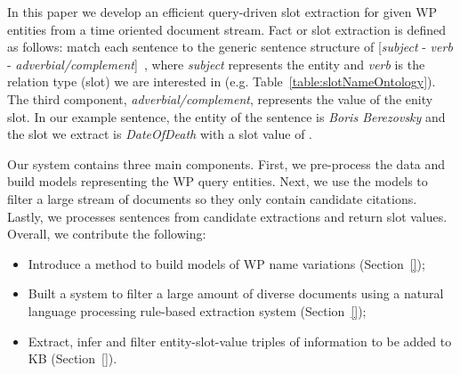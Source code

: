 In this paper we develop an efficient query-driven slot extraction for given WP entities from a time oriented document stream.
Fact or slot extraction is defined as follows: match each sentence to the generic sentence structure of [\textit{subject} - \textit{verb} - \textit{adverbial/complement}]~\cite{sentencePatterns08}, where  \textit{subject} represents the entity and \textit{verb} is the relation type (slot) we are interested in (e.g. Table~\ref{table:slotNameOntology}).
The third component, \textit{adverbial/complement}, represents the value of the enity slot.
In our example sentence, the entity of the sentence is \textit{Boris Berezovsky} and the slot we extract is
\textit{DateOfDeath} with a slot value of .




Our system contains three main components.
First, we pre-process the data and build models representing the WP query entities.
Next, we use the models to filter a large stream of documents so they only contain candidate citations.
Lastly, we processes sentences from candidate extractions and return slot values. 
Overall, we contribute the following:
\begin{itemize}[noitemsep,nolistsep]
\item Introduce a method to build models of WP name variations (Section~\ref{});
\item Built a system to filter a large amount of diverse documents using a natural language processing rule-based extraction system (Section~\ref{});
\item Extract, infer and filter entity-slot-value triples of information to be added to KB (Section~\ref{}).
\end{itemize}

